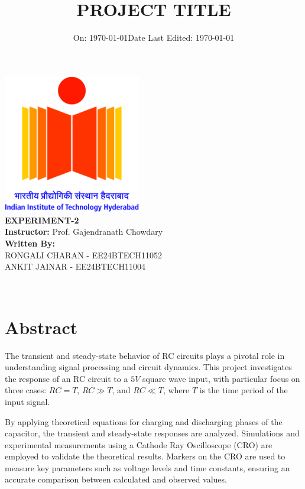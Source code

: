 \documentclass[12pt,a4paper]{report}
\title{\LARGE \textbf{PROJECT TITLE}}
\author{}
\date{\large On: \today}
\begin{document}
\makeatletter
\begin{titlepage}
    \centering
    \vspace*{1cm}
       { \includegraphics[width=6cm]{figs/logo.jpg}}\\[1cm]

    {\LARGE \textbf{EXPERIMENT-2}}\\[1cm]
    
    
    
    \textbf{Instructor: }{Prof. Gajendranath Chowdary}\\[1cm]
    
    \textbf{Written By:}\\{RONGALI CHARAN - EE24BTECH11052\\ ANKIT JAINAR - EE24BTECH11004}\\[1cm]
    \date{\large Date Last Edited: \today}
    {\@date\\}
\end{titlepage}
\makeatother

\chapter*{Abstract}
The transient and steady-state behavior of RC circuits plays a pivotal role in understanding signal processing and circuit dynamics. This project investigates the response of an RC circuit to a \( 5V\) square wave input, with particular focus on three cases: \(RC = T\), \(RC \gg T\), and \(RC \ll T\), where \(T\) is the time period of the input signal.  

By applying theoretical equations for charging and discharging phases of the capacitor, the transient and steady-state responses are analyzed. Simulations and experimental measurements using a Cathode Ray Oscilloscope (CRO) are employed to validate the theoretical results. Markers on the CRO are used to measure key parameters such as voltage levels and time constants, ensuring an accurate comparison between calculated and observed values.  
\end{document}
